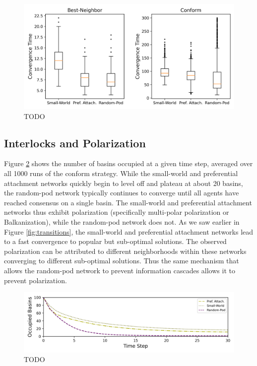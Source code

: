 \documentclass[manuscript,screen,review,acmsmall]{acmart}
\begin{document}
\begin{figure}
\begin{center}
\includegraphics[width=5in]{fig-netdelib-converge-net-boxplot.png}
\caption{TODO}
\label{fig:convergence}
\begin{description}
\end{description}
\end{center}
\end{figure}

\subsection{Interlocks and Polarization}
Figure \ref{fig:basins} shows the number of basins occupied at a given time
step, averaged over all 1000 runs of the conform strategy.
While the small-world and preferential attachment networks quickly begin to
level off and plateau at about 20 basins,
the random-pod network typically continues to converge until all agents have reached consensus on a single basin.
The small-world and preferential attachment networks thus exhibit polarization
(specifically multi-polar polarization or Balkanization),
while the random-pod network does not.
As we saw earlier in Figure \ref{fig:transitions},
the small-world and preferential attachment networks lead to a fast convergence to popular but sub-optimal solutions.
The observed polarization can be attributed to different neighborhoods within these networks converging to different sub-optimal solutions.
Thus the same mechanism that allows the random-pod network to prevent information cascades allows it to prevent polarization.

\begin{figure}
\begin{center}
\includegraphics[width=5in]{fig-conform-basin.png}
\caption{TODO}
\label{fig:basins}
\begin{description}
\end{description}
\end{center}
\end{figure}
\end{document}
